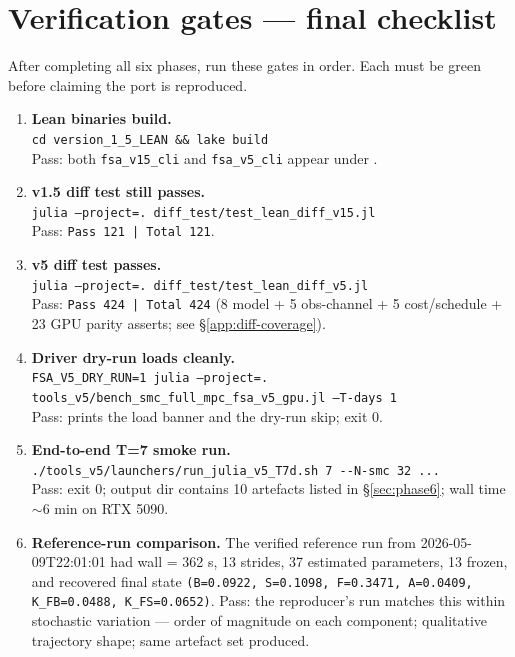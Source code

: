 \documentclass[11pt,a4paper]{article}
\begin{document}
\section{Verification gates --- final checklist}
\label{sec:gates}

After completing all six phases, run these gates in order. Each
must be green before claiming the port is reproduced.

\begin{enumerate}[itemsep=3pt]
  \item \textbf{Lean binaries build.} \\
        \texttt{cd version\_1\_5\_LEAN \&\& lake build} \\
        Pass: both \texttt{fsa\_v15\_cli} and \texttt{fsa\_v5\_cli}
        appear under .
  \item \textbf{v1.5 diff test still passes.} \\
        \texttt{julia --project=. diff\_test/test\_lean\_diff\_v15.jl} \\
        Pass: \texttt{Pass 121 | Total 121}.
  \item \textbf{v5 diff test passes.} \\
        \texttt{julia --project=. diff\_test/test\_lean\_diff\_v5.jl} \\
        Pass: \texttt{Pass 424 | Total 424} (8 model + 5 obs-channel
        + 5 cost/schedule + 23 GPU parity asserts; see
        \S\ref{app:diff-coverage}).
  \item \textbf{Driver dry-run loads cleanly.} \\
        \texttt{FSA\_V5\_DRY\_RUN=1 julia --project=. tools\_v5/bench\_smc\_full\_mpc\_fsa\_v5\_gpu.jl --T-days 1} \\
        Pass: prints the load banner and the dry-run skip; exit 0.
  \item \textbf{End-to-end T=7 smoke run.} \\
        \verb|./tools_v5/launchers/run_julia_v5_T7d.sh 7 --N-smc 32 ...| \\
        Pass: exit 0; output dir contains 10 artefacts listed in
        \S\ref{sec:phase6}; wall time $\sim 6$ min on RTX 5090.
  \item \textbf{Reference-run comparison.} The verified reference
        run from 2026-05-09T22:01:01 had wall = 362 s, 13 strides,
        37 estimated parameters, 13 frozen, and recovered final
        state \texttt{(B=0.0922, S=0.1098, F=0.3471, A=0.0409, K\_FB=0.0488, K\_FS=0.0652)}.
        Pass: the reproducer's run matches this within stochastic
        variation --- order of magnitude on each component;
        qualitative trajectory shape; same artefact set produced.
\end{enumerate}
\end{document}
